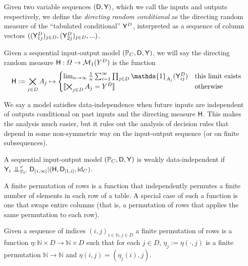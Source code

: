 Given two variable sequences $(\mathsf{D},\mathsf{Y})$, which we call the inputs and outputs respectively, we define the \emph{directing random conditional} as the directing random measure of the ``tabulated conditional'' $\mathsf{Y}^D$, interpreted as a sequence of column vectors $((\mathsf{Y}^D_{1j})_{j\in D},(\mathsf{Y}^D_{2j})_{j\in D},...)$.

\begin{definition}\label{def:dir_rand_cond}
Given a sequential input-output model $(\mathbb{P}_C,\mathsf{D},\mathsf{Y})$, we will say the directing random measure $\mathsf{H}:\Omega\to \mathcal{M}_1(Y^D)$ is the function
\begin{align}
    \RV{H} := \bigtimes_{j\in D} A_j \mapsto \begin{cases}
    \lim_{n\to \infty}\frac{1}{n} \sum_{i=1}^{\infty} \prod_{j\in D} \mathds{1}_{A_j}(\RV{Y}^D_{ij}) & \text{this limit exists}\\
    \llbracket \bigtimes_{j\in D} A_j = Y^D \rrbracket &\text{otherwise}
    \end{cases} 
\end{align}
\end{definition}

We say a model satisfies data-independence when future inputs are independent of outputs conditional on past inputs and the directing measure $\mathsf{H}$. This makes the analysis much easier, but it rules out the analysis of decision rules that depend in some non-symmetric way on the input-output sequence (or on finite subsequences).

\begin{definition}\label{def:weak_di}
A sequential input-output model $(\mathbb{P}_C,\mathsf{D},\mathsf{Y})$ is weakly data-independent if $\RV{Y}_i\CI^e_{\prob{P}_C} \RV{D}_{(i,\infty]}|(\RV{H},\RV{D}_{[1,i]},\text{id}_C)$.
\end{definition}

A finite permutation of rows is a function that independently permutes a finite number of elements in each row of a table. A special case of such a function is one that swaps entire columns (that is, a permutation of rows that applies the same permutation to each row).

\begin{definition}
Given a sequence of indices $(i,j)_{i\in \mathbb{N},j\in D}$ a finite permutation of rows is a function $\eta:\mathbb{N}\times D\to \mathbb{N}\times D$ such that for each $j\in D$, $\eta_j:=\eta(\cdot,j)$ is a finite permutation $\mathbb{N}\to \mathbb{N}$ and $\eta(i,j)=(\eta_j(i),j)$.
\end{definition}


